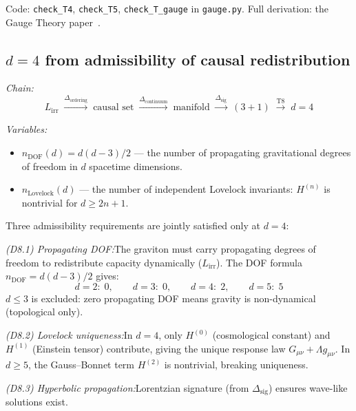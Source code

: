 \documentclass[11pt]{article}
\newcommand{\Lirr}{L_{\mathrm{irr}}}
\begin{document}
Code: \texttt{check\_T4}, \texttt{check\_T5}, \texttt{check\_T\_gauge} in \texttt{gauge.py}.  Full derivation: the Gauge Theory paper~\cite{PGT}.


\subsection{\texorpdfstring{$d=4$}{d=4} from admissibility of causal redistribution}

\begin{tcolorbox}[apfbox, title={T8: Spacetime Dimension $d = 4$ from Three Admissibility Filters}]
\textit{Chain:}
\begin{equation}
\Lirr \;\xrightarrow{\Delta_{\mathrm{ordering}}}\; \text{causal set} \;\xrightarrow{\Delta_{\mathrm{continuum}}}\; \text{manifold} \;\xrightarrow{\Delta_{\mathrm{sig}}}\; (3{+}1) \;\xrightarrow{\text{T8}}\; d=4
\end{equation}

\smallskip\noindent\textit{Variables:}
\begin{itemize}[nosep,leftmargin=2em]
\item $n_{\mathrm{DOF}}(d) = d(d-3)/2$ --- the number of propagating gravitational degrees of freedom in $d$ spacetime dimensions.
\item $n_{\mathrm{Lovelock}}(d)$ --- the number of independent Lovelock invariants: $H^{(n)}$ is nontrivial for $d \ge 2n + 1$.
\end{itemize}
\end{tcolorbox}

Three admissibility requirements are jointly satisfied only at $d = 4$:

\textit{(D8.1) Propagating DOF:}\quad The graviton must carry propagating degrees of freedom to redistribute capacity dynamically ($\Lirr$).  The DOF formula $n_{\mathrm{DOF}} = d(d-3)/2$ gives:
\begin{equation}
d = 2:\; 0, \qquad d = 3:\; 0, \qquad d = 4:\; 2, \qquad d = 5:\; 5
\end{equation}
$d \le 3$ is excluded: zero propagating DOF means gravity is non-dynamical (topological only).

\textit{(D8.2) Lovelock uniqueness:}\quad In $d = 4$, only $H^{(0)}$ (cosmological constant) and $H^{(1)}$ (Einstein tensor) contribute, giving the unique response law $G_{\mu\nu} + \Lambda g_{\mu\nu}$.  In $d \ge 5$, the Gauss--Bonnet term $H^{(2)}$ is nontrivial, breaking uniqueness.

\textit{(D8.3) Hyperbolic propagation:}\quad Lorentzian signature (from $\Delta_{\mathrm{sig}}$) ensures wave-like solutions exist.
\end{document}

